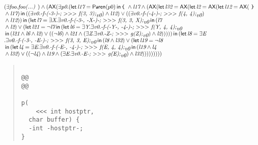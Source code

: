 \documentclass{article}
\newcommand{\AX}{\mbox{\sf{AX}}}
\newcommand{\mita}[1]{\mbox{\it{{#1}}}}
\newcommand{\msf}[1]{\mbox{\sf{{#1}}}}
\newcommand{\mth}[1]{\({#1}\)}
\newcommand{\ttlb}{\mbox{\tt \char'173}}
\newcommand{\ttrb}{\mbox{\tt \char'175}}
\begin{document}
\[\begin{array}{l}
(\exists \mita{foo} . \mita{foo(...) }) \wedge (\AX(\exists \mita{p0} . (\mita{\sf{let}} \, \mita{l17} = \msf{Paren}(p0) \, \mita{\sf{in}} \, \mita{{\ttlb}
  } \wedge \mita{l17} \wedge (\AX(\mita{\sf{let}} \, \mita{l32} = \AX(\mita{\sf{let}} \, \mita{l2} = \AX(\mita{\sf{let}} \, \mita{l12} = \AX(\mita{
{\ttrb}}\\\mbox{} \wedge \mita{l17}) \, \mita{\sf{in}} \, ((\exists \mita{v0} . \mita{-f-(-3-)-;
  \mth{>}\mth{>}\mth{>} f(3, 3);}_{\mita{v0}}) \wedge \mita{l12}) \vee ((\exists \mita{v0} . \mita{-f-(-4-)-;
  \mth{>}\mth{>}\mth{>} f(4, 4);}_{\mita{v0}})\\\mbox{} \wedge \mita{l12})
) \, \mita{\sf{in}} \, (\mita{\sf{let}} \, \mita{l7} = \exists \mita{X} . \exists \mita{v0} . \mita{-f-(-3-, -X-)-;
  \mth{>}\mth{>}\mth{>} f(3, 3, X);}_{\mita{v0}} \, \mita{\sf{in}} \, (\mita{l7}\\\mbox{} \wedge \mita{l2}) \vee (\mita{\sf{let}} \, \mita{l21} = \neg \mita{l7} \, \mita{\sf{in}} \, (\mita{\sf{let}} \, \mita{l6} = \exists \mita{Y} . \exists \mita{v0} . \mita{-f-(-Y-, -4-)-;
  \mth{>}\mth{>}\mth{>} f(Y, 4, 4);}_{\mita{v0}}\\\mbox{} \, \mita{\sf{in}} \, (\mita{l21} \wedge \mita{l6} \wedge \mita{l2}) \vee ((\neg \mita{l6}) \wedge \mita{l21} \wedge (\exists \mita{Z} . \exists \mita{v0} . \mita{-Z-;
  \mth{>}\mth{>}\mth{>} g(Z);}_{\mita{v0}}) \wedge \mita{l2})
)
)
)
) \, \mita{\sf{in}} \, (\mita{\sf{let}} \, \mita{l8} = \exists \mita{E}\\\mbox{} . \exists \mita{v0} . \mita{-f-(-3-, -E-)-;
  \mth{>}\mth{>}\mth{>} f(3, 3, E);}_{\mita{v0}} \, \mita{\sf{in}} \, (\mita{l8} \wedge \mita{l32}) \vee (\mita{\sf{let}} \, \mita{l19} = \neg \mita{l8}\\\mbox{} \, \mita{\sf{in}} \, (\mita{\sf{let}} \, \mita{l4} = \exists \mita{E} . \exists \mita{v0} . \mita{-f-(-E-, -4-)-;
  \mth{>}\mth{>}\mth{>} f(E, 4, 4);}_{\mita{v0}} \, \mita{\sf{in}} \, (\mita{l19} \wedge \mita{l4}\\\mbox{} \wedge \mita{l32}) \vee ((\neg \mita{l4}) \wedge \mita{l19} \wedge (\exists \mita{E} . \exists \mita{v0} . \mita{-E-;
  \mth{>}\mth{>}\mth{>} g(E);}_{\mita{v0}}) \wedge \mita{l32})
)
)
)
))
)))
\end{array}\]

\begin{quote}\begin{verbatim}

@@
@@

p(
    <<< int hostptr, 
  char buffer) {
  -int -hostptr-;
}
\end{verbatim}\end{quote}
\end{document}

